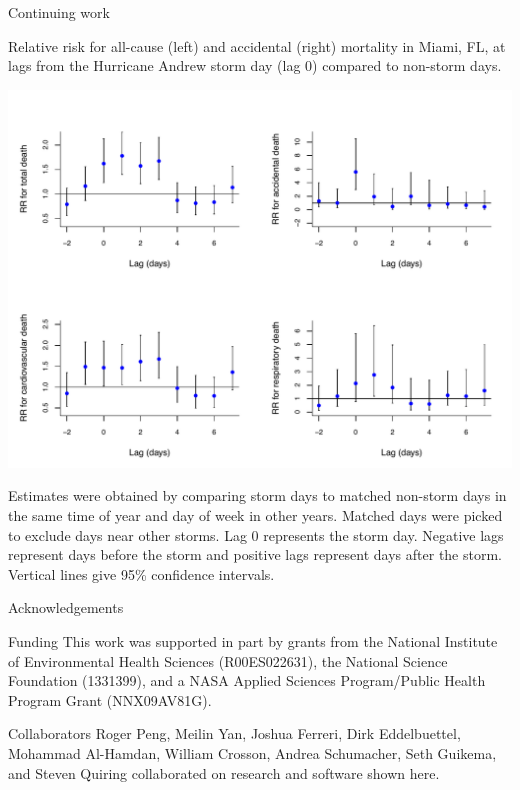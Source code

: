 \documentclass[ignorenonframetext,]{beamer}
\begin{document}
\begin{frame}{Continuing work}

\begin{centering}
\small Relative risk for all-cause (left) and accidental (right) mortality in Miami, FL, at lags from the Hurricane Andrew storm day (lag 0) compared to non-storm days.
\end{centering}

\includegraphics{miami_andrew_2.pdf}

\vspace{-0.2cm} \scriptsize Estimates were obtained by comparing storm
days to matched non-storm days in the same time of year and day of week
in other years. Matched days were picked to exclude days near other
storms. Lag 0 represents the storm day. Negative lags represent days
before the storm and positive lags represent days after the storm.
Vertical lines give 95\% confidence intervals.

\end{frame}

\begin{frame}{Acknowledgements}

\small

\begin{block}{Funding}
This work was supported in part by grants from the National Institute of Environmental Health Sciences (R00ES022631), the National Science Foundation (1331399), and a NASA Applied Sciences Program/Public Health Program Grant (NNX09AV81G).
\end{block}

\begin{block}{Collaborators}
Roger Peng, Meilin Yan, Joshua Ferreri, Dirk Eddelbuettel, Mohammad Al-Hamdan, William Crosson, Andrea Schumacher, Seth Guikema, and Steven Quiring collaborated on research and software shown here.
\end{block}

\end{frame}
\end{document}
